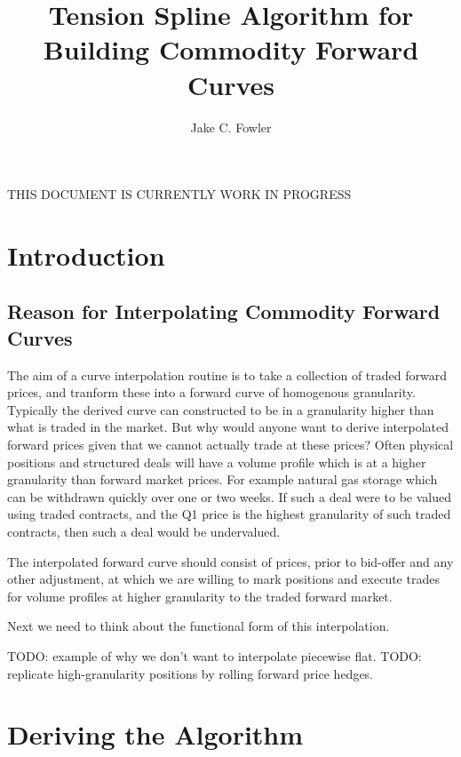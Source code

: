 \documentclass{article}
\title{Tension Spline Algorithm for Building Commodity Forward Curves}
\author{Jake C. Fowler}
\date{}
\begin{document}
\newcommand{\+}[1]{\ensuremath{\mathbf{#1}}}

\maketitle

THIS DOCUMENT IS CURRENTLY WORK IN PROGRESS

\section{Introduction}
\subsection{Reason for Interpolating Commodity Forward Curves}
The aim of a curve interpolation routine is to take a collection of traded forward prices, and tranform these into a forward curve
of homogenous granularity. Typically the derived curve can constructed to be in 
a granularity higher than what is traded in the market. But why would anyone want
to derive interpolated forward prices given that we cannot actually trade at these
prices? Often physical positions and structured deals will have a volume profile
which is at a higher granularity than forward market prices. For example natural
gas storage which can be withdrawn quickly over one or two weeks. If such a deal
were to be valued using traded contracts, and the Q1 price is the highest granularity
of such traded contracts, then such a deal would be undervalued.

\bigskip

The interpolated forward curve should consist of prices, prior to bid-offer and
any other adjustment, at which we are willing to mark positions and execute trades
for volume profiles at higher granularity to the traded forward market.

Next we need to think about the functional form of this interpolation. 

TODO: example of why we don't want to interpolate piecewise flat.
TODO: replicate high-granularity positions by rolling forward price hedges.

\section{Deriving the Algorithm}
\end{document}
